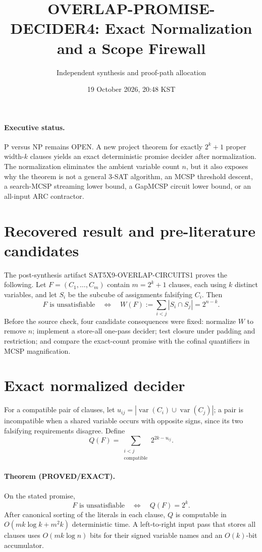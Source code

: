 \documentclass[11pt]{article}
\title{OVERLAP-PROMISE-DECIDER4: Exact Normalization and a Scope Firewall}
\author{Independent synthesis and proof-path allocation}
\date{19 October 2026, 20:48 KST}
\begin{document}
\maketitle

\paragraph{Executive status.}
P versus NP remains OPEN.  A new project theorem for exactly $2^k+1$
proper width-$k$ clauses yields an exact deterministic promise decider after
normalization.  The normalization eliminates the ambient variable count $n$,
but it also exposes why the theorem is not a general 3-SAT algorithm, an MCSP
threshold descent, a search-MCSP streaming lower bound, a GapMCSP circuit lower
bound, or an all-input ARC contractor.

\section{Recovered result and pre-literature candidates}
The post-synthesis artifact SAT5X9-OVERLAP-CIRCUITS1 proves the following.  Let
$F=(C_1,\ldots,C_m)$ contain $m=2^k+1$ clauses, each using $k$ distinct
variables, and let $S_i$ be the subcube of assignments falsifying $C_i$.  Then
\[
 F\text{ is unsatisfiable}\quad\Longleftrightarrow\quad
 W(F):=\sum_{i<j}|S_i\cap S_j|=2^{n-k}.
\]
Before the source check, four candidate consequences were fixed: normalize
$W$ to remove $n$; implement a store-all one-pass decider; test closure under
padding and restriction; and compare the exact-count promise with the cofinal
quantifiers in MCSP magnification.

\section{Exact normalized decider}
For a compatible pair of clauses, let
$u_{ij}=|\operatorname{var}(C_i)\cup\operatorname{var}(C_j)|$; a pair is
incompatible when a shared variable occurs with opposite signs, since its two
falsifying requirements disagree.  Define
\[
 Q(F)=\sum_{\substack{i<j\\\text{compatible}}}2^{2k-u_{ij}}.
\]

\paragraph{Theorem (PROVED/EXACT).}
On the stated promise,
\[
 F\text{ is unsatisfiable}\quad\Longleftrightarrow\quad Q(F)=2^k.
\]
After canonical sorting of the literals in each clause, $Q$ is computable in
$O(mk\log k+m^2k)$ deterministic time.  A left-to-right input pass that stores
all clauses uses $O(mk\log n)$ bits for their signed variable names and an
$O(k)$-bit accumulator.
\end{document}
